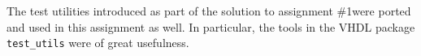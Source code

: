 The test utilities introduced as part of the solution to assignment \#1\cn were ported and used in this assignment as well.
In particular, the tools in the VHDL package \texttt{test\_utils} were of great usefulness.

